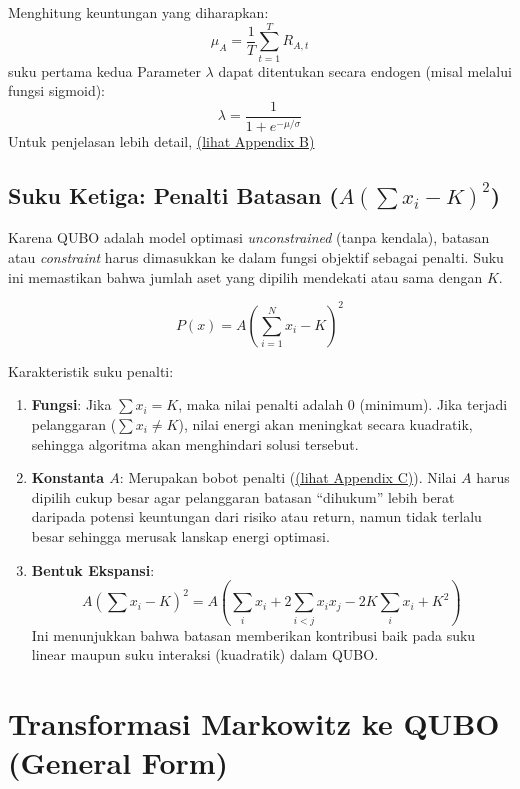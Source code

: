 \documentclass[12pt,a4paper]{article}
\providecommand{\tightlist}{%
  \setlength{\itemsep}{0pt}\setlength{\parskip}{0pt}}
\begin{document}
Menghitung keuntungan yang diharapkan: \[ \mu_A = \frac{1}{T} \sum_{t=1}^T R_{A,t} \] suku pertama kedua Parameter \(\lambda\) dapat ditentukan secara endogen (misal melalui fungsi sigmoid): \[ \lambda = \frac{1}{1 + e^{-\mu/\sigma}} \] Untuk penjelasan lebih detail, \hyperref[appendix-b]{(lihat Appendix B)} \\

\subsection{\texorpdfstring{Suku Ketiga: Penalti Batasan (\(A (\sum x_i - K)^2\))}{Suku Ketiga: Penalti Batasan}}\label{c.-suku-ketiga-penalti-batasan}

Karena QUBO adalah model optimasi \emph{unconstrained} (tanpa kendala), batasan atau \emph{constraint} harus dimasukkan ke dalam fungsi objektif sebagai penalti. Suku ini memastikan bahwa jumlah aset yang dipilih mendekati atau sama dengan \(K\).

\[ P(x) = A \left( \sum_{i=1}^N x_i - K \right)^2 \]

Karakteristik suku penalti: 
\begin{enumerate}
\def\labelenumi{\arabic{enumi}.}
\tightlist
    \item \textbf{Fungsi}: Jika \(\sum x_i = K\), maka nilai penalti adalah 0 (minimum). Jika terjadi pelanggaran (\(\sum x_i \neq K\)), nilai energi akan meningkat secara kuadratik, sehingga algoritma akan menghindari solusi tersebut.
    \item \textbf{Konstanta \(A\)}: Merupakan bobot penalti (\hyperref[appendix-c]{(lihat Appendix C)}). Nilai \(A\) harus dipilih cukup besar agar pelanggaran batasan ``dihukum'' lebih berat daripada potensi keuntungan dari risiko atau return, namun tidak terlalu besar sehingga merusak lanskap energi optimasi.
    \item \textbf{Bentuk Ekspansi}: \[ A \left( \sum x_i - K \right)^2 = A \left( \sum_i x_i + 2 \sum_{i < j} x_i x_j - 2K \sum_i x_i + K^2 \right) \] Ini menunjukkan bahwa batasan memberikan kontribusi baik pada suku linear maupun suku interaksi (kuadratik) dalam QUBO.
\end{enumerate}

\hypertarget{transformasi-markowitz-ke-qubo-general-form}{%
\section{Transformasi Markowitz ke QUBO (General Form)}\label{transformasi-markowitz-ke-qubo-general-form}}
\end{document}
